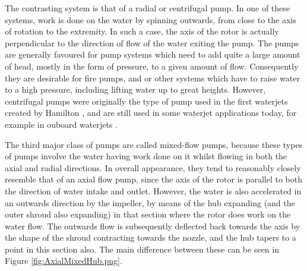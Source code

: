 \documentclass{article}\usepackage[]{graphicx}\usepackage[]{color}
\begin{document}
The contrasting system is that of a radial or centrifugal pump.  In one of these systems, work is done on the water by spinning outwards, from close to the axis of rotation to the extremity. In such a case, the axis of the rotor is actually perpendicular to the direction of flow of the water exiting the pump.  The pumps are generally favoured for pump systems which need to add quite a large amount of head, mostly in the form of pressure, to a given amount of flow.  Consequently they are desirable for fire pumps, and or other systems which have to raise water to a high pressure, including lifting water up to great heights. However, centrifugal pumps were originally the type of pump used in the first waterjets created by Hamilton \parencite{hamilton1997}, and are still used in some waterjet applications today, for example in ouboard waterjets \parencite{yamaha2018}.

The third major class of pumps are called mixed-flow pumps, because these types of pumps involve the water having work done on it whilst flowing in both the axial and radial directions.  In overall appearance, they tend to reasonably closely resemble that of an axial flow pump, since the axis of the rotor is parallel to both the direction of water intake and outlet.  However, the water is also accelerated in an outwards direction by the impeller, by means of the hub expanding (and the outer shroud also expanding) in that section where the rotor does work on the water flow. The outwards flow is subsequently deflected back towards the axis by the shape of the shroud contracting towards the nozzle, and the hub tapers to a point in this section also.  The main difference between these can be seen in Figure \ref{fig:AxialMixedHub.png}.
\end{document}
